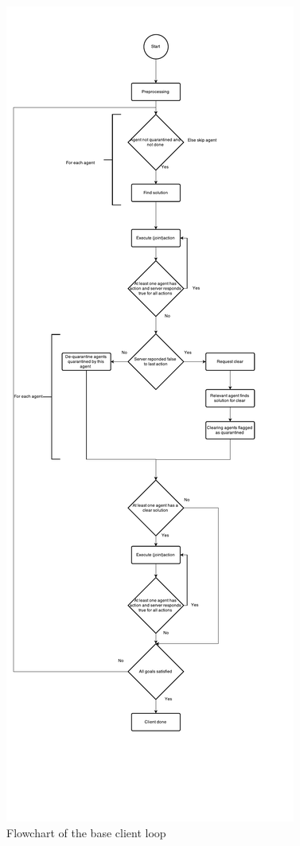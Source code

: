 \documentclass[letterpaper]{article}
\begin{document}
\begin{figure}[!htb]
\centering
\includegraphics[scale=0.47]{ClientFlowchart.pdf}
\caption{Flowchart of the base client loop}
\label{fig:clientFlowchart}
\end{figure}
\end{document}
